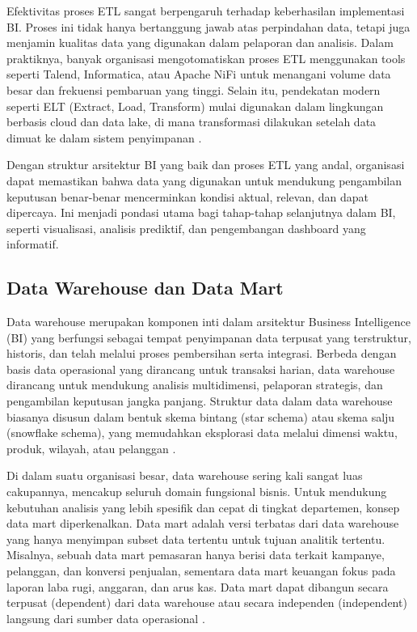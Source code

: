 Efektivitas proses ETL sangat berpengaruh terhadap keberhasilan implementasi BI. Proses ini tidak hanya bertanggung jawab atas perpindahan data, tetapi juga menjamin kualitas data yang digunakan dalam pelaporan dan analisis. Dalam praktiknya, banyak organisasi mengotomatiskan proses ETL menggunakan tools seperti Talend, Informatica, atau Apache NiFi untuk menangani volume data besar dan frekuensi pembaruan yang tinggi. Selain itu, pendekatan modern seperti ELT (Extract, Load, Transform) mulai digunakan dalam lingkungan berbasis cloud dan data lake, di mana transformasi dilakukan setelah data dimuat ke dalam sistem penyimpanan \cite{kimball2013etl}.

Dengan struktur arsitektur BI yang baik dan proses ETL yang andal, organisasi dapat memastikan bahwa data yang digunakan untuk mendukung pengambilan keputusan benar-benar mencerminkan kondisi aktual, relevan, dan dapat dipercaya. Ini menjadi pondasi utama bagi tahap-tahap selanjutnya dalam BI, seperti visualisasi, analisis prediktif, dan pengembangan dashboard yang informatif.

\subsection{Data Warehouse dan Data Mart}

Data warehouse merupakan komponen inti dalam arsitektur Business Intelligence (BI) yang berfungsi sebagai tempat penyimpanan data terpusat yang terstruktur, historis, dan telah melalui proses pembersihan serta integrasi. Berbeda dengan basis data operasional yang dirancang untuk transaksi harian, data warehouse dirancang untuk mendukung analisis multidimensi, pelaporan strategis, dan pengambilan keputusan jangka panjang. Struktur data dalam data warehouse biasanya disusun dalam bentuk skema bintang (star schema) atau skema salju (snowflake schema), yang memudahkan eksplorasi data melalui dimensi waktu, produk, wilayah, atau pelanggan \cite{inmon2002dw2}.

Di dalam suatu organisasi besar, data warehouse sering kali sangat luas cakupannya, mencakup seluruh domain fungsional bisnis. Untuk mendukung kebutuhan analisis yang lebih spesifik dan cepat di tingkat departemen, konsep data mart diperkenalkan. Data mart adalah versi terbatas dari data warehouse yang hanya menyimpan subset data tertentu untuk tujuan analitik tertentu. Misalnya, sebuah data mart pemasaran hanya berisi data terkait kampanye, pelanggan, dan konversi penjualan, sementara data mart keuangan fokus pada laporan laba rugi, anggaran, dan arus kas. Data mart dapat dibangun secara terpusat (dependent) dari data warehouse atau secara independen (independent) langsung dari sumber data operasional \cite{moss2003data}.

